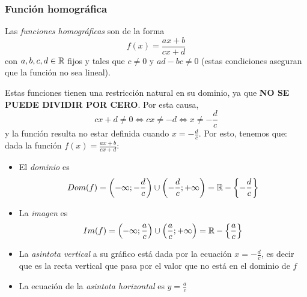 \documentclass[../Teoría.root.tex]{subfiles}
\begin{document}
\subsubsection{Función homográfica}
Las \textit{funciones homográficas} son de la forma \[f(x)=\frac{ax+b}{cx+d}\] con \(a,b,c,d \in \mathbb{R}\) fijos y tales que \(c\neq0\) y \(ad-bc\neq0\) (estas condiciones aseguran que la función no sea lineal).
\begin{center}
\end{center}
Estas funciones tienen una restricción natural en su dominio, ya que \textbf{NO SE PUEDE DIVIDIR POR CERO}.
Por esta causa, \[cx+d\neq0\Longleftrightarrow cx\neq-d\Longleftrightarrow x\neq-\frac{d}{c}\] y la función resulta no estar definida cuando \(x=-\frac{d}{c}\).
Por esto, tenemos que:
dada la función \(f(x)=\frac{ax+b}{cx+d}\):
\begin{itemize}
    \item El \textit{dominio} es \[Dom(f)=\left(-\infty;-\frac{d}{c}\right)\cup\left(-\frac{d}{c};+\infty\right)=\mathbb{R}-\left\{-\frac{d}{c}\right\}\]
    \item La \textit{imagen} es \[Im(f)=\left(-\infty;\frac{a}{c}\right)\cup\left(\frac{a}{c};+\infty\right)=\mathbb{R}-\left\{\frac{a}{c}\right\}\]
    \item La \textit{asintota vertical} a su gráfico está dada por la ecuación \(x=-\frac{d}{c}\), es decir que es la recta vertical que pasa por el valor que no está en el dominio de \(f\)
    \item La ecuación de la \textit{asintota horizontal} es \(y=\frac{a}{c}\)
\end{itemize}
\end{document}

